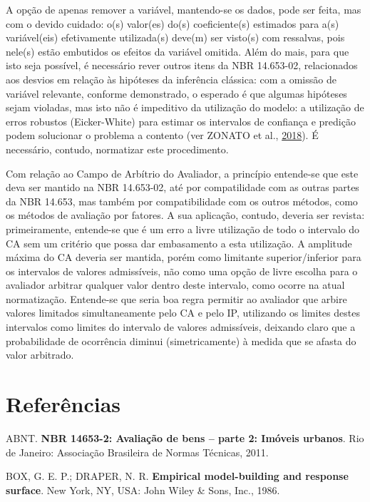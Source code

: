 \documentclass[
  a4paper, 11pt]{article}
\begin{document}
A opção de apenas remover a variável, mantendo-se os dados, pode ser
feita, mas com o devido cuidado: o(s) valor(es) do(s) coeficiente(s)
estimados para a(s) variável(eis) efetivamente utilizada(s) deve(m) ser
visto(s) com ressalvas, pois nele(s) estão embutidos os efeitos da
variável omitida. Além do mais, para que isto seja possível, é
necessário rever outros itens da NBR 14.653-02, relacionados aos desvios
em relação às hipóteses da inferência clássica: com a omissão de
variável relevante, conforme demonstrado, o esperado é que algumas
hipóteses sejam violadas, mas isto não é impeditivo da utilização do
modelo: a utilização de erros robustos (Eicker-White) para estimar os
intervalos de confiança e predição podem solucionar o problema a
contento (ver ZONATO et al., \protect\hyperlink{ref-zonato2018}{2018}).
É necessário, contudo, normatizar este procedimento.

Com relação ao Campo de Arbítrio do Avaliador, a princípio entende-se
que este deva ser mantido na NBR 14.653-02, até por compatilidade com as
outras partes da NBR 14.653, mas também por compatibilidade com os
outros métodos, como os métodos de avaliação por fatores. A sua
aplicação, contudo, deveria ser revista: primeiramente, entende-se que é
um erro a livre utilização de todo o intervalo do CA sem um critério que
possa dar embasamento a esta utilização. A amplitude máxima do CA
deveria ser mantida, porém como limitante superior/inferior para os
intervalos de valores admissíveis, não como uma opção de livre escolha
para o avaliador arbitrar qualquer valor dentro deste intervalo, como
ocorre na atual normatização. Entende-se que seria boa regra permitir ao
avaliador que arbire valores limitados simultaneamente pelo CA e pelo
IP, utilizando os limites destes intervalos como limites do intervalo de
valores admissíveis, deixando claro que a probabilidade de ocorrência
diminui (simetricamente) à medida que se afasta do valor arbitrado.

\hypertarget{referuxeancias}{%
\section*{Referências}\label{referuxeancias}}

\hypertarget{refs}{}
\leavevmode\hypertarget{ref-NBR1465302}{}%
ABNT. \textbf{NBR 14653-2: Avaliação de bens -- parte 2: Imóveis
urbanos}. Rio de Janeiro: Associação Brasileira de Normas Técnicas,
2011.

\leavevmode\hypertarget{ref-Box1986}{}%
BOX, G. E. P.; DRAPER, N. R. \textbf{Empirical model-building and
response surface}. New York, NY, USA: John Wiley \& Sons, Inc., 1986.
\end{document}
